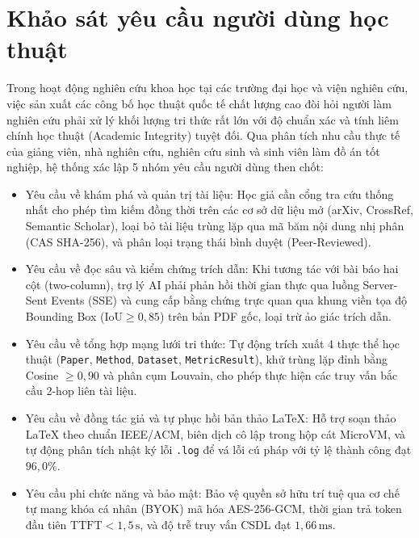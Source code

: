 \section{Khảo sát yêu cầu người dùng học thuật}
\label{sec:mo_ta_bai_toan}

Trong hoạt động nghiên cứu khoa học tại các trường đại học và viện nghiên cứu, việc sản xuất các công bố học thuật quốc tế chất lượng cao đòi hỏi người làm nghiên cứu phải xử lý khối lượng tri thức rất lớn với độ chuẩn xác và tính liêm chính học thuật (Academic Integrity) tuyệt đối. Qua phân tích nhu cầu thực tế của giảng viên, nhà nghiên cứu, nghiên cứu sinh và sinh viên làm đồ án tốt nghiệp, hệ thống \VS xác lập 5 nhóm yêu cầu người dùng then chốt:

\begin{itemize}[noitemsep, topsep=2pt]
    \item Yêu cầu về khám phá và quản trị tài liệu: Học giả cần cổng tra cứu thống nhất cho phép tìm kiếm đồng thời trên các cơ sở dữ liệu mở (arXiv, CrossRef, Semantic Scholar), loại bỏ tài liệu trùng lặp qua mã băm nội dung nhị phân (CAS SHA-256), và phân loại trạng thái bình duyệt (Peer-Reviewed).
    \item Yêu cầu về đọc sâu và kiểm chứng trích dẫn: Khi tương tác với bài báo hai cột (two-column), trợ lý AI phải phản hồi thời gian thực qua luồng Server-Sent Events (SSE) và cung cấp bằng chứng trực quan qua khung viền tọa độ Bounding Box ($\text{IoU} \ge 0{,}85$) trên bản PDF gốc, loại trừ ảo giác trích dẫn.
    \item Yêu cầu về tổng hợp mạng lưới tri thức: Tự động trích xuất 4 thực thể học thuật (\texttt{Paper}, \texttt{Method}, \texttt{Dataset}, \texttt{MetricResult}), khử trùng lặp đỉnh bằng Cosine $\ge 0{,}90$ và phân cụm Louvain, cho phép thực hiện các truy vấn bắc cầu 2-hop liên tài liệu.
    \item Yêu cầu về đồng tác giả và tự phục hồi bản thảo LaTeX: Hỗ trợ soạn thảo LaTeX theo chuẩn IEEE/ACM, biên dịch cô lập trong hộp cát MicroVM, và tự động phân tích nhật ký lỗi \texttt{.log} để vá lỗi cú pháp với tỷ lệ thành công đạt $96{,}0\%$.
    \item Yêu cầu phi chức năng và bảo mật: Bảo vệ quyền sở hữu trí tuệ qua cơ chế tự mang khóa cá nhân (BYOK) mã hóa AES-256-GCM, thời gian trả token đầu tiên $\text{TTFT} < 1{,}5\,\text{s}$, và độ trễ truy vấn CSDL đạt $1{,}66\,\text{ms}$.
\end{itemize}
